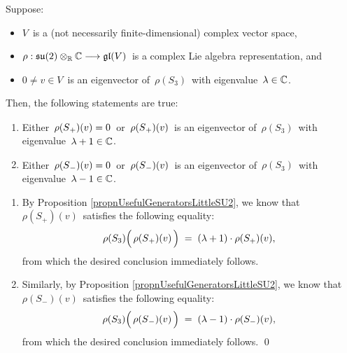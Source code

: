 \vskip 0.5cm
\begin{corollary}
\label{RaisingLoweringEigenvalues}
\mbox{}
\vskip 0.1cm
\noindent
Suppose:
\begin{itemize}
\item
	$V$\, is a (not necessarily finite-dimensional) complex vector space,
\item
	$\rho : \mathfrak{su}(2) \otimes_{\mathbb{R}} \mathbb{C} \longrightarrow \mathfrak{gl}(V)$\,
	is a complex Lie algebra representation, and
\item	
	$0 \neq v \in V$\, is an eigenvector of \,$\rho(S_{3})$\, with eigenvalue \,$\lambda \in \mathbb{C}$.\,
\end{itemize}
Then, the following statements are true:
\begin{enumerate}
\item
	Either
	\,$\rho(\overset{{\color{white}.}}{S}_{+})(v) = 0$\,
	or 
	\,$\rho(\overset{{\color{white}.}}{S}_{+})(v)$\,
	is an eigenvector of
	\,$\rho(S_{3})$\,
	with eigenvalue
	\,$\lambda + 1 \in \mathbb{C}$.\,
\item
	Either
	\,$\rho(\overset{{\color{white}.}}{S}_{-})(v) = 0$\,
	or 
	\,$\rho(\overset{{\color{white}.}}{S}_{-})(v)$\,
	is an eigenvector of
	\,$\rho(S_{3})$\,
	with eigenvalue
	\,$\lambda - 1 \in \mathbb{C}$.\,
\end{enumerate}
\end{corollary}
\proof 
\begin{enumerate}
\item
	By Proposition \ref{propnUsefulGeneratorsLittleSU2},
	we know that \,$\rho(S_{+})(v)$\, satisfies the following equality:
	\begin{equation*}
	\rho(S_{3})\!\left(\,\rho(\overset{{\color{white}.}}{S}_{+})(v)\,\right)
	\; = \;
		(\lambda+1) \cdot \rho(S_{+})(v),\,
	\end{equation*}
	from which the desired conclusion immediately follows.
\item
	Similarly, by Proposition \ref{propnUsefulGeneratorsLittleSU2},
	we know that \,$\rho(S_{-})(v)$\, satisfies the following equality:
	\begin{equation*}
	\rho(S_{3})\!\left(\,\rho(\overset{{\color{white}.}}{S}_{-})(v)\,\right)
	\; = \;
		(\lambda-1) \cdot \rho(S_{-})(v),\,
	\end{equation*}
	from which the desired conclusion immediately follows.
	\qed
\end{enumerate}


